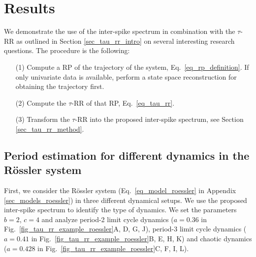 \documentclass[entropy,article,submit,pdftex,moreauthors]{Definitions/mdpi}
\begin{document}
%

\section{Results}\label{sec_tau_rr_application}

We demonstrate the use of the inter-spike spectrum in combination with the $\tau$-RR as outlined in 
Section \ref{sec_tau_rr_intro} on several interesting research questions. The procedure is the following:
\begin{itemize}[noitemsep]
\item[(1)] Compute a RP of the trajectory of the system, Eq.~\eqref{eq_rp_definition}. If only univariate data is available, perform a state space reconstruction for obtaining the trajectory first.
\item[(2)] Compute the $\tau$-RR of that RP, Eq.~\eqref{eq_tau_rr}.
\item[(3)] Transform the $\tau$-RR into the proposed inter-spike spectrum, see Section \ref{sec_tau_rr_method}.
\end{itemize}


\subsection{Period estimation for different dynamics in the R\"ossler system}
First, we consider the R\"ossler system (Eq.~\eqref{eq_model_roessler} in Appendix \ref{sec_models_roessler}) 
in three different dynamical setups. We use the proposed inter-spike spectrum to
identify the type of dynamics.
We set the parameters $b=2$, $c=4$ and analyze period-2 limit cycle dynamics ($a=0.36$ in Fig.~\ref{fig_tau_rr_example_roessler}A, D, G, J), 
period-3 limit cycle dynamics ($a=0.41$ in Fig.~\ref{fig_tau_rr_example_roessler}B, E, H, K) and chaotic dynamics ($a=0.428$ in Fig.~\ref{fig_tau_rr_example_roessler}C, F, I, L).  
\end{document}

